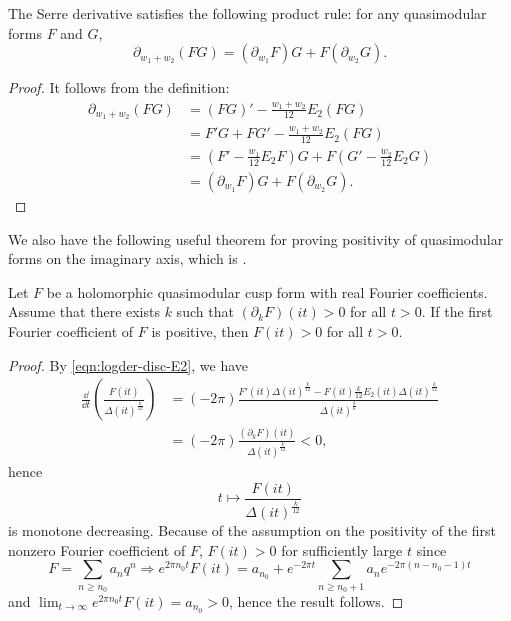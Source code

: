 \begin{theorem}\label{thm:serre-der-prod-rule} 
The Serre derivative satisfies the following product rule: for any quasimodular forms $F$ and $G$,
\begin{equation}
    \partial_{w_1 + w_2} (FG) = (\partial_{w_1}F)G + F (\partial_{w_2}G).
\end{equation}
\end{theorem}
\begin{proof}
It follows from the definition:
\begin{align}
    \partial_{w_1 + w_2} (FG) &= (FG)' - \frac{w_1 + w_2}{12} E_2 (FG) \\
    &= F'G + FG' - \frac{w_1 + w_2}{12} E_2(FG) \\
    &= \left(F' - \frac{w_1}{12}E_2 F\right)G + F \left(G' - \frac{w_2}{12}E_2 G\right) \\
    &= (\partial_{w_1}F)G + F(\partial_{w_2}G).
\end{align}
\end{proof}

We also have the following useful theorem for proving positivity of quasimodular forms on the imaginary axis, which is \cite[Proposition 3.5, Corollary 3.6]{Lee}.
\begin{theorem}\label{thm:anti-serre-der-pos}
Let $F$ be a holomorphic quasimodular cusp form with real Fourier coefficients.
Assume that there exists $k$ such that $(\partial_{k}F)(it) > 0$ for all $t > 0$.
If the first Fourier coefficient of $F$ is positive, then $F(it) > 0$ for all $t > 0$.
\end{theorem}
\begin{proof}
By \eqref{eqn:logder-disc-E2}, we have
\begin{align}
    \frac{\dd}{\dd t} \left( \frac{F(it)}{\Delta(it)^{\frac{k}{12}}}\right)
    &= (-2 \pi) \frac{F'(it) \Delta(it)^{\frac{k}{12}} - F(it) \frac{k}{12} E_{2}(it) \Delta(it)^{\frac{k}{12}}}{\Delta(it)^{\frac{k}{6}}} \\
    &= (-2 \pi) \frac{(\partial_{k} F)(it)}{\Delta(it)^{\frac{k}{12}}}  < 0,
\end{align}
hence
\[
t \mapsto \frac{F(it)}{\Delta(it)^{\frac{k}{12}}}
\]
is monotone decreasing.
Because of the assumption on the positivity of the first nonzero Fourier coefficient of $F$, $F(it) > 0$ for sufficiently large $t$ since
\[
F = \sum_{n \geq n_{0}} a_{n} q^{n} \Rightarrow e^{2 \pi n_{0} t} F(it) = a_{n_{0}} + e^{-2 \pi t}\sum_{n\geq n_{0} + 1} a_{n} e^{-2 \pi (n - n_{0} - 1)t}
\]
and $\lim_{t \to \infty} e^{2 \pi n_{0}t} F(it) = a_{n_0} > 0$, hence the result follows.
\end{proof}
